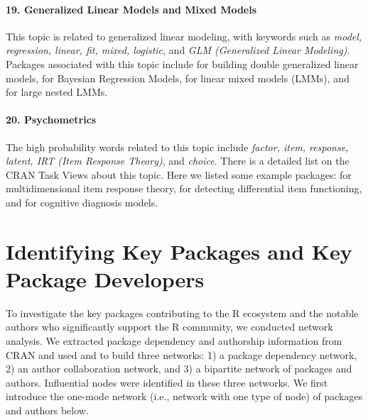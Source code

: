 \paragraph{19. Generalized Linear Models and Mixed Models} This topic is related to generalized linear modeling, with keywords such as {\it model, regression, linear, fit, mixed, logistic}, and {\it GLM (Generalized Linear Modeling)}. Packages associated with this topic include  for building double generalized linear models,  for Bayesian Regression Models,  for linear mixed models (LMMs), and  for large nested LMMs.

\paragraph{20. Psychometrics} The high probability words related to this topic include {\it factor, item, response, latent, IRT (Item Response Theory)}, and {\it choice}. There is a detailed list on the CRAN Task Views about this topic. Here we listed some example packages:  for multidimensional item response theory,  for detecting differential item functioning, and  for cognitive diagnosis models.























\section{Identifying Key Packages and Key Package Developers}




To investigate the key packages contributing to the R ecosystem and the notable authors who significantly support the R community, we conducted network analysis. We extracted package dependency and authorship information from CRAN and used  \citep{cranly} and    \citep{csardi2006igraph} to build three networks: 1) a package dependency network, 2) an author collaboration network, and 3) a bipartite network of packages and authors. Influential nodes were identified in these three networks. We first introduce the one-mode network (i.e., network with one type of node) of packages and authors below.

